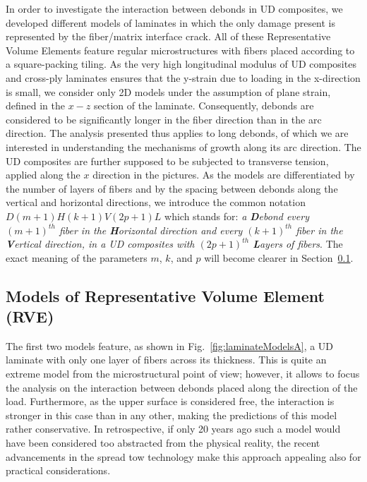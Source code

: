 \documentclass[review]{elsarticle}
\begin{document}
In order to investigate the interaction between debonds in UD composites, we developed different models of laminates in which the only damage present is represented by the fiber/matrix interface crack. All of these Representative Volume Elements feature regular microstructures with fibers placed according to a square-packing tiling. As the very high longitudinal modulus of UD composites and cross-ply laminates ensures that the y-strain due to loading in the x-direction is small, we consider only 2D models under the assumption of plane strain, defined in the $x-z$ section of the laminate. Consequently, debonds are considered to be significantly longer in the fiber direction than in the arc direction. The analysis presented thus applies to long debonds, of which we are interested in understanding the mechanisms of growth along its arc direction. The UD composites are further supposed to be subjected to transverse tension, applied along the $x$ direction in the pictures. As the models are differentiated by the number of layers of fibers and by the spacing between debonds along the vertical and horizontal directions, we introduce the common notation $D\left(m+1\right)H\left(k+1\right)V\left(2p+1\right)L$ which stands for: \textit{a \textbf{D}ebond every $\left(m+1\right)^{th}$ fiber in the \textbf{H}orizontal direction and every $\left(k+1\right)^{th}$ fiber in the \textbf{V}ertical direction, in a UD composites with $\left(2p+1\right)^{th}$ \textbf{L}ayers of fibers}. The exact meaning of the parameters $m$, $k$, and $p$ will become clearer in Section~\ref{subsec:rve}.

\subsection{Models of Representative Volume Element (RVE)}\label{subsec:rve}

The first two models feature, as shown in Fig.~\ref{fig:laminateModelsA}, a UD laminate with only one layer of fibers across its thickness. This is quite an extreme model from the microstructural point of view; however, it allows to focus the analysis on the interaction between debonds placed along the direction of the load. Furthermore, as the upper surface is considered free, the interaction is stronger in this case than in any other, making the predictions of this model rather conservative.  In retrospective, if only 20 years ago such a model would have been considered too abstracted from the physical reality, the recent advancements in the spread tow technology make this approach appealing also for practical considerations.
\end{document}
